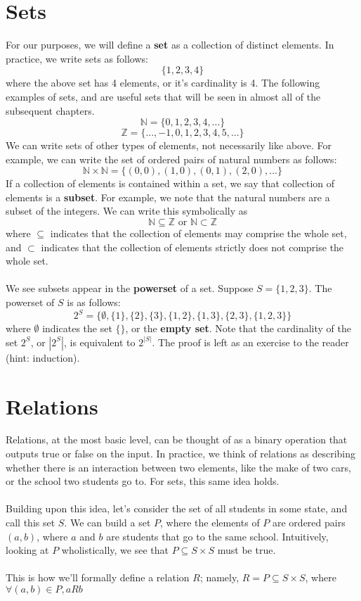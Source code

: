 \documentclass[11pt]{report}
\newcommand{\Z}{\mathbb{Z}}
\newcommand{\N}{\mathbb{N}}
\begin{document}
\section{Sets}
For our purposes, we will define a \textbf{set} as a collection of distinct elements. In practice, we write sets as follows:
$$\{1,2,3,4\}$$
where the above set has 4 elements, or it's cardinality is 4. The following examples of sets, and are useful sets that will be seen in almost all of the subsequent chapters.
$$\N = \{0,1,2,3,4,...\}$$
$$\Z = \{...,-1,0,1,2,3,4,5,...\}$$
We can write sets of other types of elements, not necessarily like above. For example, we can write the set of ordered pairs of natural numbers as follows:
$$\N \times \N = \{(0,0), (1,0), (0,1), (2,0), ...\}$$
If a collection of elements is contained within a set, we say that collection of elements is a \textbf{subset}. For example, we note that the natural numbers are a subset of the integers. We can write this symbolically as
$$\N \subseteq \Z \text{ or } \N \subset \Z $$
where $\subseteq$ indicates that the collection of elements may comprise the whole set, and $\subset$ indicates that the collection of elements strictly does not comprise the whole set.
\\ \\
We see subsets appear in the \textbf{powerset} of a set. Suppose $S = \{1,2,3\}$. The powerset of $S$ is as follows:
$$2^S = \{\emptyset, \{1\}, \{2\}, \{3\}, \{1,2\}, \{1,3\}, \{2,3\}, \{1,2,3\}\}$$
where $\emptyset$ indicates the set $\{\}$, or the \textbf{empty set}. Note that the cardinality of the set $2^S$, or $|2^S|$, is equivalent to $2^{|S|}$. The proof is left as an exercise to the reader (hint: induction).

\section{Relations}
Relations, at the most basic level, can be thought of as a binary operation that outputs true or false on the input. In practice, we think of relations as describing whether there is an interaction between two elements, like the make of two cars, or the school two students go to. For sets, this same idea holds. \\ \\
Building upon this idea, let's consider the set of all students in some state, and call this set $S$. We can build a set $P$, where the elements of $P$ are ordered pairs $(a,b)$, where $a$ and $b$ are students that go to the same school. Intuitively, looking at $P$ wholistically, we see that $P \subseteq S \times S$ must be true. \\ \\
This is how we'll formally define a relation $R$; namely, $R = P \subseteq S \times S$, where $\forall (a,b) \in P, aRb$
\end{document}
